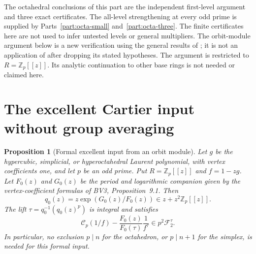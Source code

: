 \documentclass[11pt,a4paper]{article}
\newtheorem{proposition}[theorem]{Proposition}
\theoremstyle{definition}\newtheorem{definition}[theorem]{Definition}
\theoremstyle{remark}\newtheorem{remark}[theorem]{Remark}
\newcommand{\Zp}{\mathbb Z_p}
\numberwithin{equation}{section}
\begin{document}
The octahedral conclusions of this part are the independent first-level
argument and three exact certificates. The all-level strengthening at
every odd prime is supplied by Parts~\ref{part:octa-small} and~\ref{part:octa-three}.
The finite certificates here are not used to infer untested levels or
general multipliers.
The orbit-module argument below is a new verification using the general
results of \cite[Sections 2--5]{BV3}; it is not an application of
\cite[Theorem 7.3]{BV3} after dropping its stated hypotheses.
The argument is restricted to $R=\Zp[[z]]$. Its analytic continuation to
other base rings is not needed or claimed here.

\section{The excellent Cartier input without group averaging}\label{SP:source-main-2}
\begin{proposition}[Formal excellent input from an orbit module]\label{SP:prop:orbit}
Let $g$ be the hypercubic, simplicial, or hyperoctahedral Laurent
polynomial, with vertex coefficients one, and let $p$ be an odd prime.
Put $R=\mathbb Z_p[[z]]$ and $f=1-zg$.
Let $F_0(z)$ and $G_0(z)$ be the period and logarithmic companion
given by the vertex-coefficient formulas of BV3, Proposition~9.1.
Then
\[
 q_0(z)=z\exp(G_0(z)/F_0(z))\in z+z^2\mathbb Z_p[[z]].
\]
The lift $\tau=q_0^{-1}(q_0(z)^p)$ is integral and satisfies
\[
 \mathscr C_p(1/f)-\frac{F_0(z)}{F_0(\tau)}\frac1{f^\tau}
 \in p^2\mathscr F_2^\tau.
\]
In particular, no exclusion $p\mid n$ for the octahedron, or
$p\mid n+1$ for the simplex, is needed for this formal input.
\end{proposition}
\end{document}
